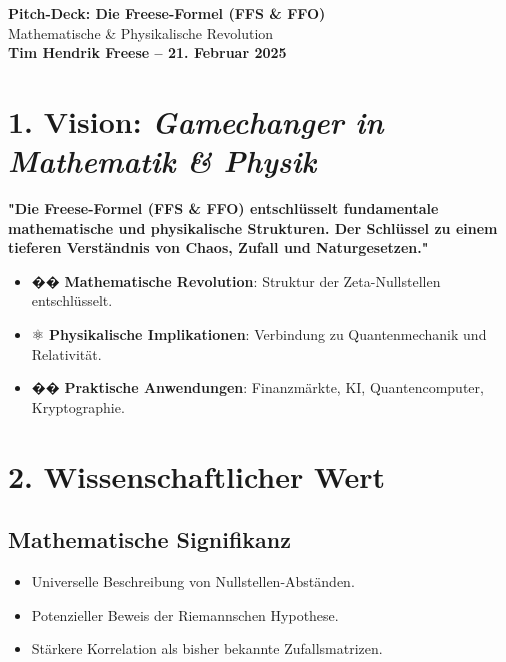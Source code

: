 \documentclass[a4paper,10pt]{article}
\begin{document}
\begin{center}
    \huge \textbf{Pitch-Deck: Die Freese-Formel (FFS \& FFO)} \\[0.3cm]
    \Large Mathematische \& Physikalische Revolution \\[0.5cm]
    \small \textbf{Tim Hendrik Freese – 21. Februar 2025}
\end{center}

\vspace{0.5cm}

\section*{1. Vision: \textit{Gamechanger in Mathematik \& Physik}}

\textbf{"Die Freese-Formel (FFS \& FFO) entschlüsselt fundamentale mathematische und physikalische Strukturen. Der Schlüssel zu einem tieferen Verständnis von Chaos, Zufall und Naturgesetzen."}

\begin{itemize}
    \item �� \textbf{Mathematische Revolution}: Struktur der Zeta-Nullstellen entschlüsselt.
    \item ⚛️ \textbf{Physikalische Implikationen}: Verbindung zu Quantenmechanik und Relativität.
    \item �� \textbf{Praktische Anwendungen}: Finanzmärkte, KI, Quantencomputer, Kryptographie.
\end{itemize}

\vspace{0.3cm}

\section*{2. Wissenschaftlicher Wert}

\subsection*{Mathematische Signifikanz}

\begin{itemize}
    \item Universelle Beschreibung von Nullstellen-Abständen.
    \item Potenzieller Beweis der Riemannschen Hypothese.
    \item Stärkere Korrelation als bisher bekannte Zufallsmatrizen.
\end{itemize}
\end{document}
